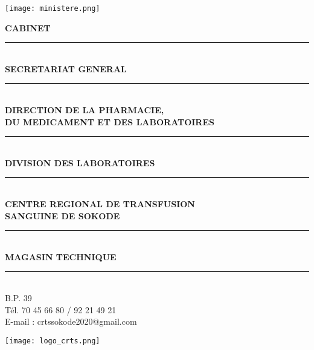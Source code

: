 \documentclass[10pt,landscape]{report}
\begin{document}
\begin{center}
    \texttt{[image: ministere.png]}
\end{center}

\vspace{1cm}

\noindent
\begin{minipage}[t]{0.6\textwidth}
  \small
  \textbf{CABINET} \\
  \rule{6cm}{0.4pt} \\[0.2em]
  \textbf{SECRETARIAT GENERAL} \\
  \rule{8cm}{0.4pt} \\[0.2em]
  \textbf{DIRECTION DE LA PHARMACIE,} \\
  \textbf{DU MEDICAMENT ET DES LABORATOIRES} \\
  \rule{8cm}{0.4pt} \\[0.2em]
  \textbf{DIVISION DES LABORATOIRES} \\
  \rule{8cm}{0.4pt} \\[0.2em]
  \textbf{CENTRE REGIONAL DE TRANSFUSION} \\
  \textbf{SANGUINE DE SOKODE} \\
  \rule{8cm}{0.4pt} \\[0.2em]
  \textbf{MAGASIN TECHNIQUE} \\
  \rule{5cm}{0.4pt} \\[0.2em]
  B.P. 39 \\
  Tél. 70 45 66 80 / 92 21 49 21 \\
  E-mail : crtssokode2020@gmail.com
\end{minipage}%
\hfill
\begin{minipage}[t]{0.35\textwidth}
  \vspace{2cm}
  \centering
  \texttt{[image: logo\_crts.png]}
\end{minipage}

\vspace{1cm}

\begin{center}
\end{center}

\vspace{0.5cm}
\end{document}
